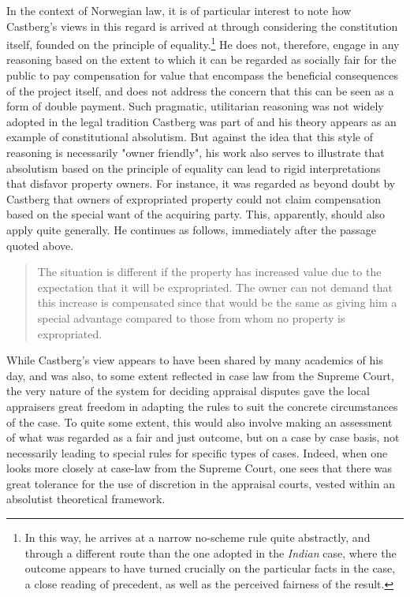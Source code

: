 \documentclass[10pt]{article} %
\begin{document}
In the context of Norwegian law, it is of particular interest to note how Castberg's views in this regard is arrived at through considering the constitution itself, founded on the principle of equality.\footnote{In this way, he arrives at a narrow no-scheme rule quite abstractly, and through a different route than the one adopted in the \emph{Indian} case, where the outcome appears to have turned crucially on the particular facts in the case, a close reading of precedent, as well as the perceived fairness of the result.} He does not, therefore, engage in any reasoning based on the extent to which it can be regarded as socially fair for the public to pay compensation for value that encompass the beneficial consequences of the project itself, and does not address the concern that this can be seen as a form of double payment. Such pragmatic, utilitarian reasoning was not widely adopted in the legal tradition Castberg was part of and his theory appears as an example of constitutional absolutism. But against the idea that this style of reasoning is necessarily "owner friendly", his work also serves to illustrate that absolutism based on the principle of equality can lead to rigid interpretations that disfavor property owners. For instance, it was regarded as beyond doubt by Castberg that owners of expropriated property could not claim compensation based on the special want of the acquiring party. This, apparently, should also apply quite generally. He continues as follows, immediately after the passage quoted above.

\begin{quote}
The situation is different if the property has increased value due to the expectation that it will be expropriated. The owner can not demand that this increase is compensated since that would be the same as giving him a special advantage compared to those from whom no property is expropriated.
\end{quote}

While Castberg's view appears to have been shared by many academics of his day, and was also, to some extent reflected in case law from the Supreme Court, the very nature of the system for deciding appraisal disputes gave the local appraisers great freedom in adapting the rules to suit the concrete circumstances of the case. To quite some extent, this would also involve making an assessment of what was regarded as a fair and just outcome, but on a case by case basis, not necessarily leading to special rules for specific types of cases. Indeed, when one looks more closely at case-law from the Supreme Court, one sees that there was  great tolerance for the use of discretion in the appraisal courts, vested within an absolutist theoretical framework.
\end{document}
